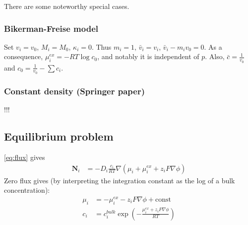 \documentclass[12pt,oneside,reqno]{amsart}
\numberwithin{equation}{section}
\begin{document}
There are some noteworthy special cases.

\subsubsection{Bikerman-Freise model}
\cite{Bikerman, Freise, Fuhrmann2015}
Set $v_i=v_0$, $M_i=M_0$, $\kappa_i=0$. Thus $m_i=1$, $\bar v_i=v_i$, $\bar v_i -m_i v_0=0$.
As a consequence, $\mu_i^{ex} = -RT\log c_0$, and notably it is independent of $p$.
Also, $\bar c=\frac{1}{v_0}$ and $c_0=\frac{1}{v_0} - \sum c_i$.


\subsubsection{Constant density (Springer paper)}!!!


\subsection{Equilibrium problem}
\eqref{eq:flux} gives
\begin{align}\label{eq:fluxx}
  \mathbf N_i &= - D_i\frac{c_i}{RT}\nabla\left( \mu_i +  \mu_i^{ex} + z_i F \nabla \phi \right)
\end{align}
Zero flux gives (by interpreting the integration constant as the log of a bulk concentration):
\begin{align}
  \mu_i   &=   - \mu_i^{ex} - z_i F \nabla \phi + \text{const}\\
  c_i   &=  c_i^{bulk}\exp\left( -\frac{\mu_i^{ex} + z_i F \nabla \phi}{RT}\right) 
\end{align}
\end{document}
